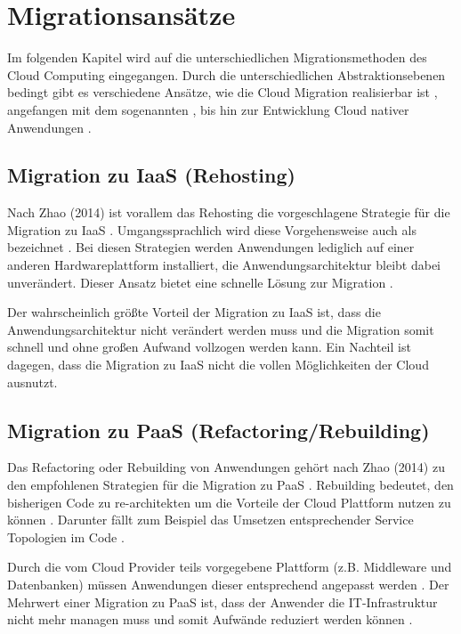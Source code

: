 \section{Migrationsansätze}

Im folgenden Kapitel wird auf die unterschiedlichen Migrationsmethoden des Cloud Computing eingegangen. Durch die unterschiedlichen Abstraktionsebenen bedingt gibt es verschiedene Ansätze, wie die Cloud Migration realisierbar ist \cite[Vgl.][S. 226]{Surianarayanan2019}, angefangen mit dem sogenannten \grqq{}, bis hin zur Entwicklung Cloud nativer Anwendungen \cite[Vgl.][S. 144]{Zhao2014}.

\subsection{Migration zu IaaS (Rehosting)}
Nach Zhao (2014) ist vorallem das Rehosting die vorgeschlagene Strategie für die Migration zu \ac{IaaS} \cite[Vgl.][S. 144]{Zhao2014}. Umgangssprachlich wird diese Vorgehensweise auch als \grqq{} bezeichnet \cite[Vgl.][]{NetApp}. Bei diesen Strategien werden Anwendungen lediglich auf einer anderen Hardwareplattform installiert, die Anwendungsarchitektur bleibt dabei unverändert. Dieser Ansatz bietet eine schnelle Lösung zur Migration \cite[Vgl.][]{CIO}.

Der wahrscheinlich größte Vorteil der Migration zu \ac{IaaS} ist, dass die Anwendungsarchitektur nicht verändert werden muss und die Migration somit schnell und ohne großen Aufwand vollzogen werden kann. Ein Nachteil ist dagegen, dass die Migration zu \ac{IaaS} nicht die vollen Möglichkeiten der Cloud ausnutzt.

\subsection{Migration zu PaaS (Refactoring/Rebuilding)}
Das Refactoring oder Rebuilding von Anwendungen gehört nach Zhao (2014) zu den empfohlenen Strategien für die Migration zu \ac{PaaS} \cite[Vgl.][S. 144]{Zhao2014}. Rebuilding bedeutet, den bisherigen Code zu re-architekten um die Vorteile der Cloud Plattform nutzen zu können \cite[Vgl.][]{CIO}. Darunter fällt zum Beispiel das Umsetzen entsprechender Service Topologien im Code \cite[Vgl.][S. 2]{Holmes2018}.

Durch die vom Cloud Provider teils vorgegebene Plattform (z.B. Middleware und Datenbanken) müssen Anwendungen dieser entsprechend angepasst werden \cite[Vgl.][S. 227]{Surianarayanan2019}. Der Mehrwert einer Migration zu \ac{PaaS} ist, dass der Anwender die IT-Infrastruktur nicht mehr managen muss und somit Aufwände reduziert werden können \cite[Vgl.][S. 6]{Pahl}.

